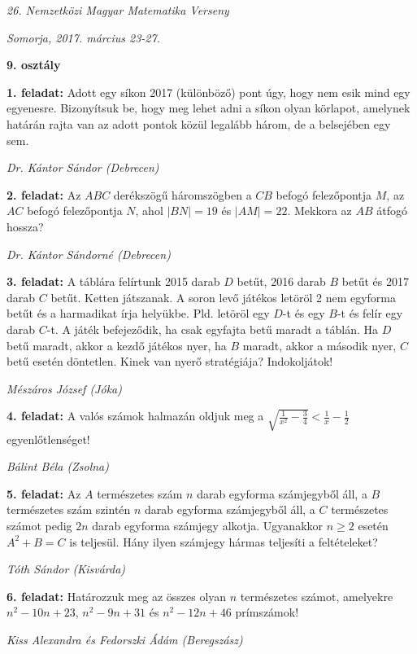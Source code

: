 \documentclass[a4paper,10pt]{article}
\newcommand{\ki}[2]{\hfill {\it #1 (#2)}\medskip}
\begin{document}
\begin{center} \Large {\em 26. Nemzetközi Magyar Matematika Verseny} \end{center}
\begin{center} \large{\em Somorja, 2017. március 23-27.} \end{center}
\smallskip
\begin{center} \large{\bf 9. osztály} \end{center}
\bigskip 

{\bf 1. feladat: } Adott egy síkon 2017 (különböző) pont úgy, hogy nem esik mind egy egyenesre. Bizonyítsuk be, hogy meg
lehet adni a síkon olyan körlapot, amelynek határán rajta van az adott pontok közül legalább három, de a
belsejében egy sem.

\ki{Dr. Kántor Sándor}{Debrecen}\medskip

{\bf 2. feladat: } Az $ABC$ derékszögű háromszögben a $CB$ befogó felezőpontja $M$, az $AC$ befogó felezőpontja $N$, ahol
$|BN|=19$ és $|AM|=22$. Mekkora az $AB$ átfogó hossza?

\ki{Dr. Kántor Sándorné}{Debrecen}\medskip

{\bf 3. feladat: } A táblára felírtunk 2015 darab $D$ betűt, 2016 darab $B$ betűt és 2017 darab $C$ betűt. Ketten játszanak. A soron
levő játékos letöröl 2 nem egyforma betűt és a harmadikat írja helyükbe. Pld. letöröl egy $D$-t és egy $B$-t és felír
egy darab $C$-t. A játék befejeződik, ha csak egyfajta betű maradt a táblán. Ha $D$ betű maradt, akkor a kezdő
játékos nyer, ha $B$ maradt, akkor a második nyer, $C$ betű esetén döntetlen. Kinek van nyerő stratégiája?
Indokoljátok!

\ki{Mészáros József}{Jóka}\medskip

{\bf 4. feladat: } A valós számok halmazán oldjuk meg a $\displaystyle{\sqrt{\frac{1}{x^2}-\frac{3}{4}}<\frac{1}{x}-\frac{1}{2}}$ egyenlőtlenséget!

\ki{Bálint Béla}{Zsolna}\medskip

{\bf 5. feladat: } Az $A$ természetes szám $n$ darab egyforma számjegyből áll, a $B$ természetes szám szintén $n$ darab egyforma
számjegyből áll, a $C$ természetes számot pedig $2n$ darab egyforma számjegy alkotja. Ugyanakkor $n\ge 2$ esetén $A^2+B=C$ is teljesül. Hány ilyen számjegy hármas teljesíti a feltételeket?

\ki{Tóth Sándor}{Kisvárda}\medskip

{\bf 6. feladat: } Határozzuk meg az összes olyan $n$ természetes számot, amelyekre $n^2-10n+23$, 
$n^2-9n+31$ és $n^2-12n+46$ prímszámok!

\ki{Kiss Alexandra és Fedorszki Ádám}{Beregszász}\medskip
\end{document}
